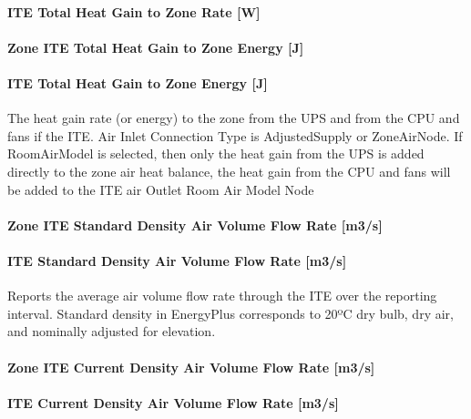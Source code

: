 \paragraph{ITE Total Heat Gain to Zone Rate {[}W{]}}\label{ite-total-heat-gain-to-zone-rate-w}

\paragraph{Zone ITE Total Heat Gain to Zone Energy {[}J{]}}\label{zone-ite-total-heat-gain-to-zone-energy-j}

\paragraph{ITE Total Heat Gain to Zone Energy {[}J{]}}\label{ite-total-heat-gain-to-zone-energy-j}

The heat gain rate (or energy) to the zone from the UPS and from the CPU and fans if the ITE. Air Inlet Connection Type is AdjustedSupply or ZoneAirNode. If RoomAirModel is selected, then only the heat gain from the UPS is added directly to the zone air heat balance, the heat gain from the CPU and fans will be added to the ITE air Outlet Room Air Model Node

\paragraph{Zone ITE Standard Density Air Volume Flow Rate {[}m3/s{]}}\label{zone-ite-standard-density-air-volume-flow-rate-m3s}

\paragraph{ITE Standard Density Air Volume Flow Rate {[}m3/s{]}}\label{ite-standard-density-air-volume-flow-rate-m3s}

Reports the average air volume flow rate through the ITE over the reporting interval. Standard density in EnergyPlus corresponds to 20ºC dry bulb, dry air, and nominally adjusted for elevation.

\paragraph{Zone ITE Current Density Air Volume Flow Rate {[}m3/s{]}}\label{zone-ite-current-density-air-volume-flow-rate-m3s}

\paragraph{ITE Current Density Air Volume Flow Rate {[}m3/s{]}}\label{ite-current-density-air-volume-flow-rate-m3s}

